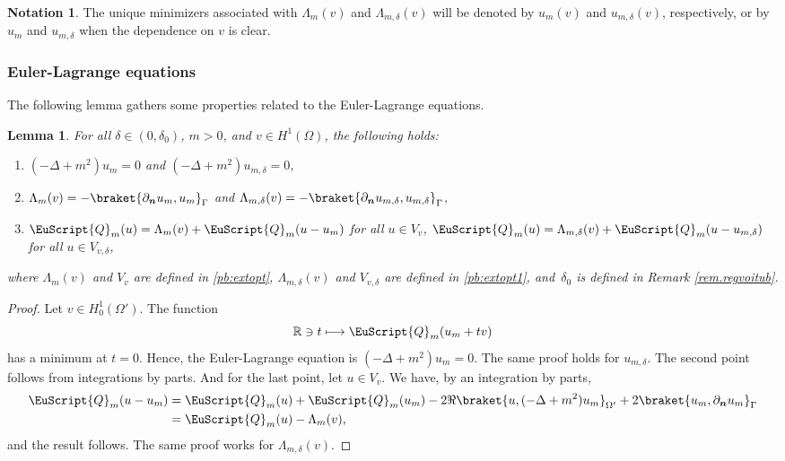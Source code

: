 \documentclass[10pt]{amsart}
\let\mathcal \EuScript
\newcommand\mto{\mathchoice{\longmapsto}{\mapsto}{\mapsto}{\mapsto}}
\newcommand{\cQ}{\mathcal{Q}}
\theoremstyle{plain}
\newtheorem{lemma}[theorem]{Lemma}
\theoremstyle{definition}
\newtheorem{notation}[theorem]{Notation}
\newcommand{\RR}{\mathbb{R}}
\newcommand{\bn}{{\boldsymbol n}}
\let\pa\partial
\begin{document}
\begin{notation}
The unique minimizers associated with $\Lambda_{m}(v)$ and $\Lambda_{m,\delta}(v)$ will be denoted by $u_m(v)$ and $u_{m,\delta}(v)$, respectively, or by $u_m$ and $u_{m,\delta}$ when the dependence on $v$ is clear.
\end{notation}

\subsubsection{Euler-Lagrange equations}

The following lemma gathers some properties related to the Euler-Lagrange equations.

\begin{lemma}\label{lem:ELE}
For all $\delta\in(0,\delta_0)$, $m>0$, and $v\in H^1(\Omega)$, the following holds:
\begin{enumerate}
\item\label{pt:cp1} $(-\Delta+m^2)u_m = 0$ and $(-\Delta+m^2)u_{m,\delta}=0$,
\item\label{pt:cp2} $\Lambda_m(v) = -\braket{\pa_\bn u_m,u_m}_\Gamma$ and $\Lambda_{m,\delta}(v) = -\braket{\pa_\bn u_{m,\delta},u_{m,\delta}}_{\Gamma}$,
\item\label{pt:cp4} $\cQ_m(u) = \Lambda_m(v) + \cQ_m(u-u_m)$ for all $u\in V_v$,
$\cQ_{m}(u) = \Lambda_{m,\delta}(v) + \cQ_{m}(u-u_{m,\delta})$ for all $u\in V_{v,\delta}$,
\end{enumerate}
where $\Lambda_m(v)$ and $V_v$ are defined in \eqref{pb:extopt}, $\Lambda_{m,\delta}(v)$ and $V_{v,\delta}$ are defined in \eqref{pb:extopt1}, and~$\delta_0$ is defined in Remark \ref{rem.regvoitub}.
\end{lemma}

\begin{proof}
Let $v\in H^1_0(\Omega')$. The function
\[
\RR\ni t\mto\cQ_m(u_m + tv)
\]
has a minimum at $t=0$. Hence, the Euler-Lagrange equation is $(-\Delta+m^2)u_m = 0$. The same proof holds for $u_{m,\delta}$. The second point follows from integrations by parts.
And for the last point, let $u\in V_v$. We have, by an integration by parts,
\[\begin{split}
\cQ_m(u-u_m)
&= \cQ_m(u)+\cQ_m(u_m) - 2\Re\braket{u,(-\Delta+m^2)u_m}_{\Omega'} + 2\braket{u_m,\pa_\bn u_m}_\Gamma
\\&
= \cQ_m(u) -\Lambda_m(v),
\end{split}\]
and the result follows. The same proof works for $\Lambda_{m,\delta}(v)$.
\end{proof}
\end{document}
